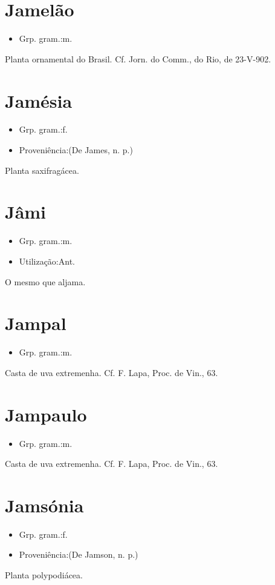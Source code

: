 \documentclass{article}
\begin{document}
\section{Jamelão}
\begin{itemize}
\item {Grp. gram.:m.}
\end{itemize}
Planta ornamental do Brasil. Cf. \textunderscore Jorn. do Comm.\textunderscore , do Rio, de 23-V-902.
\section{Jamésia}
\begin{itemize}
\item {Grp. gram.:f.}
\end{itemize}
\begin{itemize}
\item {Proveniência:(De \textunderscore James\textunderscore , n. p.)}
\end{itemize}
Planta saxifragácea.
\section{Jâmi}
\begin{itemize}
\item {Grp. gram.:m.}
\end{itemize}
\begin{itemize}
\item {Utilização:Ant.}
\end{itemize}
O mesmo que \textunderscore aljama\textunderscore .
\section{Jampal}
\begin{itemize}
\item {Grp. gram.:m.}
\end{itemize}
Casta de uva extremenha. Cf. F. Lapa, \textunderscore Proc. de Vin.\textunderscore , 63.
\section{Jampaulo}
\begin{itemize}
\item {Grp. gram.:m.}
\end{itemize}
Casta de uva extremenha. Cf. F. Lapa, \textunderscore Proc. de Vin.\textunderscore , 63.
\section{Jamsónia}
\begin{itemize}
\item {Grp. gram.:f.}
\end{itemize}
\begin{itemize}
\item {Proveniência:(De \textunderscore Jamson\textunderscore , n. p.)}
\end{itemize}
Planta polypodiácea.
\end{document}
